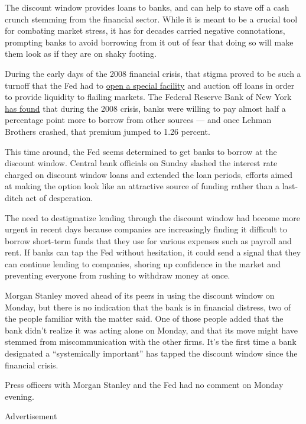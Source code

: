 The discount window provides loans to banks, and can help to stave off a
cash crunch stemming from the financial sector. While it is meant to be
a crucial tool for combating market stress, it has for decades carried
negative connotations, prompting banks to avoid borrowing from it out of
fear that doing so will make them look as if they are on shaky footing.

During the early days of the 2008 financial crisis, that stigma proved
to be such a turnoff that the Fed had to
\href{https://www.federalreserve.gov/regreform/reform-taf.htm}{open a
special facility} and auction off loans in order to provide liquidity to
flailing markets. The Federal Reserve Bank of New York
\href{https://www.newyorkfed.org/medialibrary/media/research/staff_reports/sr483.pdf}{has
found} that during the 2008 crisis, banks were willing to pay almost
half a percentage point more to borrow from other sources --- and once
Lehman Brothers crashed, that premium jumped to 1.26 percent.

This time around, the Fed seems determined to get banks to borrow at the
discount window. Central bank officials on Sunday slashed the interest
rate charged on discount window loans and extended the loan periods,
efforts aimed at making the option look like an attractive source of
funding rather than a last-ditch act of desperation.

The need to destigmatize lending through the discount window had become
more urgent in recent days because companies are increasingly finding it
difficult to borrow short-term funds that they use for various expenses
such as payroll and rent. If banks can tap the Fed without hesitation,
it could send a signal that they can continue lending to companies,
shoring up confidence in the market and preventing everyone from rushing
to withdraw money at once.

Morgan Stanley moved ahead of its peers in using the discount window on
Monday, but there is no indication that the bank is in financial
distress, two of the people familiar with the matter said. One of those
people added that the bank didn't realize it was acting alone on Monday,
and that its move might have stemmed from miscommunication with the
other firms. It's the first time a bank designated a ``systemically
important'' has tapped the discount window since the financial crisis.

Press officers with Morgan Stanley and the Fed had no comment on Monday
evening.

Advertisement

